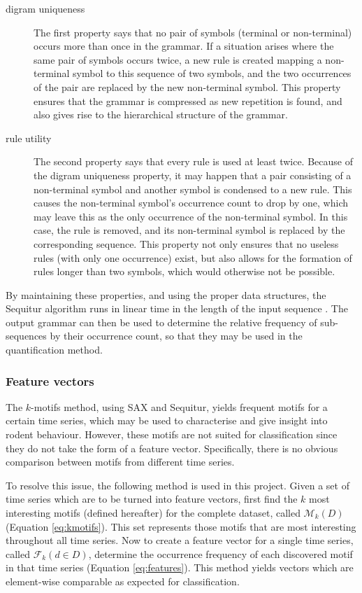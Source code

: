 \documentclass[conference,a4paper,twoside]{IEEEtran}
\begin{document}
\begin{description}
    \item[digram uniqueness] The first property says that no pair of symbols (terminal or non-terminal) occurs more than once in the grammar. If a situation arises where the same pair of symbols occurs twice, a new rule is created mapping a non-terminal symbol to this sequence of two symbols, and the two occurrences of the pair are replaced by the new non-terminal symbol. This property ensures that the grammar is compressed as new repetition is found, and also gives rise to the hierarchical structure of the grammar.
    \item[rule utility] The second property says that every rule is used at least twice. Because of the digram uniqueness property, it may happen that a pair consisting of a non-terminal symbol and another symbol is condensed to a new rule. This causes the non-terminal symbol's occurrence count to drop by one, which may leave this as the only occurrence of the non-terminal symbol. In this case, the rule is removed, and its non-terminal symbol is replaced by the corresponding sequence. This property not only ensures that no useless rules (with only one occurrence) exist, but also allows for the formation of rules longer than two symbols, which would otherwise not be possible.
\end{description}

By maintaining these properties, and using the proper data structures, the Sequitur algorithm runs in linear time in the length of the input sequence \cite{nevill1997identifying}. The output grammar can then be used to determine the relative frequency of sub-sequences by their occurrence count, so that they may be used in the quantification method.

\subsubsection{Feature vectors}
The $k$-motifs method, using SAX and Sequitur, yields frequent motifs for a certain time series, which may be used to characterise and give insight into rodent behaviour. However, these motifs are not suited for classification since they do not take the form of a feature vector. Specifically, there is no obvious comparison between motifs from different time series.

To resolve this issue, the following method is used in this project. Given a set of time series which are to be turned into feature vectors, first find the $k$ most interesting motifs (defined hereafter) for the complete dataset, called $\mathcal{M}_k(D)$ (Equation \ref{eq:kmotifs}). This set represents those motifs that are most interesting throughout all time series. Now to create a feature vector for a single time series, called $\mathcal{F}_k(d \in D)$, determine the occurrence frequency of each discovered motif in that time series (Equation \ref{eq:features}). This method yields vectors which are element-wise comparable as expected for classification.
\end{document}
